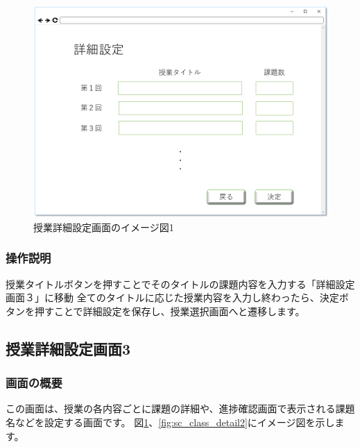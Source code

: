 \begin{figure}[htbp]
\begin{center}
  \includegraphics[width=1\linewidth,clip]{./img/sc_class_detail1.png}
  \caption{授業詳細設定画面のイメージ図1}\label{fig:sc_class_detail1}
\end{center}
\end{figure}

\subsubsection{操作説明}
授業タイトルボタンを押すことでそのタイトルの課題内容を入力する「詳細設定画面３」に移動
全てのタイトルに応じた授業内容を入力し終わったら、決定ボタンを押すことで詳細設定を保存し、授業選択画面へと遷移します。

\subsection{授業詳細設定画面3}
\subsubsection{画面の概要}
この画面は、授業の各内容ごとに課題の詳細や、進捗確認画面で表示される課題名などを設定する画面です。
図\ref{fig:sc_class_detail1}、\ref{fig:sc_class_detail2}にイメージ図を示します。

